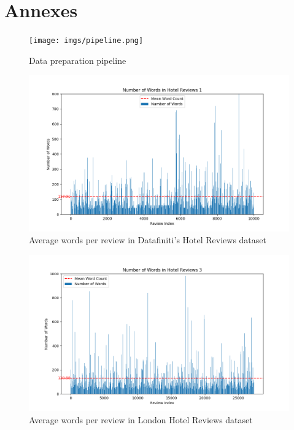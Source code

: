 \documentclass[sigconf]{acmart}
\begin{document}
\section{Annexes}

\begin{figure}[H]
  \centering
  \texttt{[image: imgs/pipeline.png]}
  \caption{Data preparation pipeline}
  \label{fig:pipeline}
\end{figure}

\begin{figure}[h]
  \centering
  \includegraphics[width=\linewidth]{imgs/word_count_1.png}
  \caption{Average words per review in Datafiniti's Hotel Reviews dataset}
  \label{fig:reviewWords1}
\end{figure}

\begin{figure}[H]
  \centering
  \includegraphics[width=\linewidth]{imgs/word_count_3.png}
  \caption{Average words per review in London Hotel Reviews dataset}
  \label{fig:reviewWords3}
\end{figure}
\end{document}
